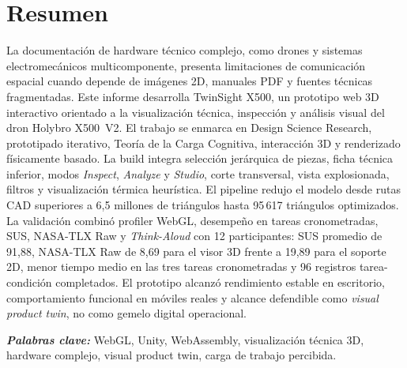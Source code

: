 ﻿\documentclass[12pt,letterpaper]{article}
\begin{document}
\section*{Resumen}
\setlength{\parindent}{0pt}
La documentación de hardware técnico complejo, como drones y sistemas electromecánicos multicomponente, presenta limitaciones de comunicación espacial cuando depende de imágenes 2D, manuales PDF y fuentes técnicas fragmentadas. Este informe desarrolla TwinSight X500, un prototipo web 3D interactivo orientado a la visualización técnica, inspección y análisis visual del dron Holybro X500~V2. El trabajo se enmarca en Design Science Research, prototipado iterativo, Teoría de la Carga Cognitiva, interacción 3D y renderizado físicamente basado. La build integra selección jerárquica de piezas, ficha técnica inferior, modos \textit{Inspect}, \textit{Analyze} y \textit{Studio}, corte transversal, vista explosionada, filtros y visualización térmica heurística. El pipeline redujo el modelo desde rutas CAD superiores a 6,5 millones de triángulos hasta 95\,617 triángulos optimizados. La validación combinó profiler WebGL, desempeño en tareas cronometradas, SUS, NASA-TLX Raw y \textit{Think-Aloud} con 12 participantes: SUS promedio de 91,88, NASA-TLX Raw de 8,69 para el visor 3D frente a 19,89 para el soporte 2D, menor tiempo medio en las tres tareas cronometradas y 96 registros tarea-condición completados. El prototipo alcanzó rendimiento estable en escritorio, comportamiento funcional en móviles reales y alcance defendible como \textit{visual product twin}, no como gemelo digital operacional.

\hspace{1.27cm}\textit{\textbf{Palabras clave:}} WebGL, Unity, WebAssembly, visualización técnica 3D, hardware complejo, visual product twin, carga de trabajo percibida.

\newpage
\end{document}
